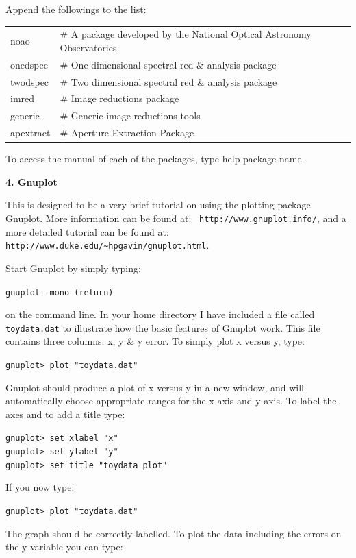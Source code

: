 \documentclass[12pt]{article}
\begin{document}
Append the followings to the list:

\begin{tabular}{ll}
{\sc noao}            &\# A package developed by the National Optical Astronomy Observatories\\
{\sc onedspec}        &\# One dimensional spectral red \& analysis package\\
{\sc twodspec}        &\# Two dimensional spectral red \& analysis package\\
{\sc imred}           &\# Image reductions package\\
{\sc generic}         &\# Generic image reductions tools\\
{\sc apextract}       &\# Aperture Extraction Package
\end{tabular}

To access the manual of each of the packages, type {\sc help package-name}.

\newpage

\begin{center}
{\large{\bf 4. Gnuplot}}
\end{center}
This is designed to be a very brief tutorial on using the plotting
package Gnuplot. More information can be found at: {\tt
http://www.gnuplot.info/}, and a more detailed tutorial can be found
at: {\tt http://www.duke.edu/\textasciitilde hpgavin/gnuplot.html}.

Start Gnuplot by simply typing:

{\tt gnuplot -mono (return)}

on the command line. In your home directory I have included a file
called {\tt toydata.dat} to illustrate how the basic features of
Gnuplot work. This file contains three columns: x, y \& y error. 
To simply plot x versus y, type:

{\tt gnuplot> plot "toydata.dat"}

Gnuplot should produce a plot of x versus y in a new window, and will
automatically choose appropriate ranges for the x-axis and y-axis. To
label the axes and to add a title type:

{\tt gnuplot> set xlabel "x"}\\
{\tt gnuplot> set ylabel "y"}\\
{\tt gnuplot> set title "toydata plot"}

If you now type:

{\tt gnuplot> plot "toydata.dat"}

The graph should be correctly labelled. To plot the data including the
errors on the y variable you can type:
\end{document}
